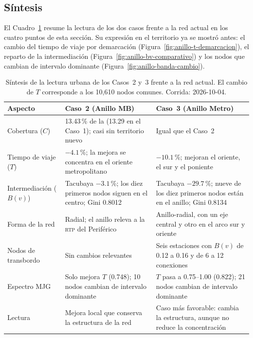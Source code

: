 \subsection{Síntesis}
\label{subsec:anillo-conclusiones-sintesis}

El Cuadro~\ref{tab:anillo-sintesis} resume la lectura de los dos casos frente a
la red actual en los cuatro puntos de esta sección. Su expresión en el
territorio ya se mostró antes: el cambio del tiempo de viaje por demarcación
(Figura~\ref{fig:anillo-t-demarcacion}), el reparto de la intermediación
(Figura~\ref{fig:anillo-bv-comparativo}) y los nodos que cambian de intervalo
dominante (Figura~\ref{fig:anillo-banda-cambio}).

\begin{table}[H]
    \centering
    \caption[Síntesis de los Casos~2 y~3]{%
    Síntesis de la lectura urbana de los Casos~2 y~3 frente a la red actual.
    El cambio de $T$ corresponde a los 10,610 nodos comunes.
    Corrida: 2026-10-04.}
    \label{tab:anillo-sintesis}
    \small
    \setlength{\tabcolsep}{4pt}
    \begin{tabularx}{\textwidth}{|l|X|X|}
        \hline
        \textbf{Aspecto} & \textbf{Caso~2 (Anillo MB)} & \textbf{Caso~3 (Anillo Metro)} \\
        \hline
        Cobertura ($C$) & 13.43\,\% de la \zmvm{} (13.29 en el Caso~1); casi sin
            territorio nuevo & Igual que el Caso~2 \\
        \hline
        Tiempo de viaje ($T$) & $-4.1$\,\%; la mejora se concentra en el oriente
            metropolitano & $-10.1$\,\%; mejoran el oriente, el sur y el poniente \\
        \hline
        Intermediación ($B(v)$) & Tacubaya $-3.1$\,\%; los diez primeros nodos
            siguen en el centro; Gini 0.8012 & Tacubaya $-29.7$\,\%; nueve de los
            diez primeros nodos están en el anillo; Gini 0.8134 \\
        \hline
        Forma de la red & Radial; el anillo releva a la \textsc{rtp} del
            Periférico & Anillo-radial, con un eje central y otro en el arco sur
            y oriente \\
        \hline
        Nodos de transbordo & Sin cambios relevantes & Seis estaciones con $B(v)$
            de 0.12 a 0.16 y de 6 a 12 conexiones \\
        \hline
        Espectro MJG & Solo mejora $T$ (0.748); 10 nodos cambian de intervalo
            dominante & $T$ pasa a 0.75--1.00 (0.822); 21 nodos cambian de intervalo
            dominante \\
        \hline
        Lectura & Mejora local que conserva la estructura de la red & Caso más
            favorable: cambia la estructura, aunque no reduce la concentración \\
        \hline
    \end{tabularx}
\end{table}

